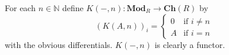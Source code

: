 \documentclass[a4paper]{memoir}
\theoremstyle{plain}
\theoremstyle{definition}
\theoremstyle{remark}
\newcommand{\N}{\mathbb{N}}
\newcommand{\ch}{\mathbf{Ch}}
\newcommand{\Mod}{\mathbf{Mod}}
\begin{document}
For each $n \in \N$ define $K(-,n) \colon \Mod_R \to \ch(R)$ by
\[
(K(A,n))_i = \begin{cases} 0 & \text{if } i \ne n \\ A & \text{if } i = n \end{cases}
\]
with the obvious differentials. $K(-,n)$ is clearly a functor.

\mainmatter











\appendix




\end{document}
